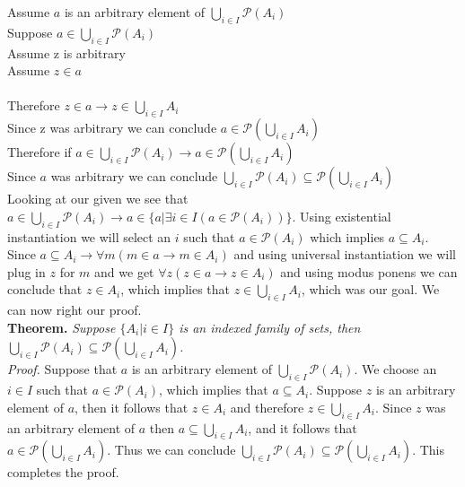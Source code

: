 \documentclass{article}
\newcommand{\n}{ \noindent }
\newcommand{\pwset}{\mathscr{P}}
\begin{document}
\n Assume $a$ is an arbitrary element of $\bigcup_{i \in I} \pwset(A_{i})$ \\
\indent Suppose $a \in \bigcup_{i \in I} \pwset(A_{i})$ \\
\indent \indent Assume z is arbitrary \\
\indent \indent \indent Assume $z \in a$ \\
\indent \indent \indent {} \\
\indent \indent \indent Therefore $z \in a \rightarrow z \in \bigcup_{i \in I} A_i $ \\
\indent \indent Since z was arbitrary we can conclude $a \in \pwset(\bigcup_{i \in I} A_i)$ \\
\indent Therefore if $a \in \bigcup_{i \in I} \pwset(A_{i}) \rightarrow a \in \pwset(\bigcup_{i \in I} A_i)$ \\
\n Since $a$ was arbitrary we can conclude $\bigcup_{i \in I} \pwset(A_{i}) \subseteq \pwset (\bigcup_{i \in I} A_{i})$ \\

\n Looking at our given we see that $a \in \bigcup_{i \in I} \pwset(A_{i}) \rightarrow a \in \{ a | \exists i \in I (a \in \pwset(A_i)) \}$. Using existential instantiation we will select an $i$ such that $a \in \pwset(A_i)$ which implies $a \subseteq A_i$. Since $a \subseteq A_i \rightarrow \forall m(m \in a \rightarrow m \in A_i)$ and using universal instantiation we will plug in $z$ for $m$ and we get $\forall z(z \in a \rightarrow z \in A_i)$ and using modus ponens we can conclude that $z \in A_i$, which implies that $z \in \bigcup_{i \in I} A_i $, which was our goal. We can now right our proof. \\


\n \textbf{Theorem.} \textit{Suppose $\{ A_{i} | i \in I \} $ is an indexed family of sets, then $\bigcup_{i \in I} \pwset(A_{i}) \subseteq \pwset (\bigcup_{i \in I} A_{i})$.} \\
\n \textit{Proof.} Suppose that $a$ is an arbitrary element of $\bigcup_{i \in I} \pwset(A_{i})$. We choose an $i \in I$ such that $a \in \pwset(A_i)$, which implies that $a \subseteq A_i$. Suppose $z$ is an arbitrary element of $a$, then it follows that $z \in A_i$ and therefore $z \in \bigcup_{i \in I} A_i$. Since $z$ was an arbitrary element of $a$ then $a \subseteq \bigcup_{i \in I} A_i$, and it follows that $a \in \pwset(\bigcup_{i \in I} A_i)$. Thus we can conclude $\bigcup_{i \in I} \pwset(A_{i}) \subseteq \pwset (\bigcup_{i \in I} A_{i})$. This completes the proof.
\end{document}
